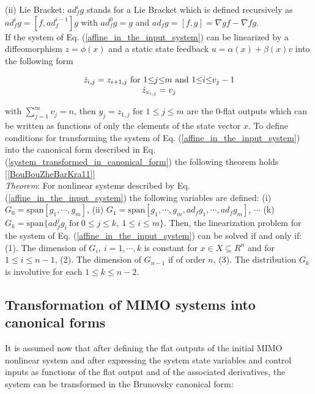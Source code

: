 \documentclass[journal]{IEEEtran}
\begin{document}
\noindent (ii) Lie Bracket: ${ad_f^i}g$ stands for a Lie Bracket which is defined recursively as ${ad_f^i}g=[f,{ad_f^{i-1}}]g$ with ${ad_f^0}g=g$ and ${ad_f}g=[f,g]={{\nabla}g}f-{{\nabla}f}g$.  \\

\noindent If the system of Eq. (\ref{affine_in_the_input_system}) can be linearized by a diffeomorphism $z=\phi(x)$ and a static state feedback $u=\alpha(x)+\beta(x)v$ into the following form

\begin{equation} \label{system_transformed_in_canonical_form}
\begin{tabular}{c}
$\dot{z}_{i,j}=z_{i+1,j} \ \text{for} \ 1{\leq}j{\leq}m \ \text{and} \ 1{\leq}i{\leq}v_j-1$ \\
$\dot{z}_{v_{i,j}}={v_j}$
\end{tabular}
\end{equation}

\noindent with ${\sum_{j=1}^m}{v_j}=n$, then $y_j=z_{1,j}$ for $1{\leq}j{\leq}m$ are the 0-flat outputs which can be written as functions of only the elements of the state vector $x$. To define conditions for transforming the system of Eq. (\ref{affine_in_the_input_system}) into the canonical form described in Eq. (\ref{system_transformed_in_canonical_form}) the following theorem holds [\ref{BouBouZheBarKra11}] \\

\noindent \textit{Theorem}: For nonlinear systems described by Eq. (\ref{affine_in_the_input_system}) the following variables are defined: (i) $G_0=\text{span}[g_1,\cdots,g_m]$, (ii) $G_1=\text{span}[g_1,\cdots,g_m,ad_f{g_1},\cdots,ad_f{g_m}]$, $\cdots$
(k) $G_k=\text{span}\{{ad_f^j}{g_i} \ \text{for} \ 0{\leq}j{\leq}k, \ 1{\leq}i{\leq}m \}$.
Then, the linearization problem for the system of Eq. (\ref{affine_in_the_input_system})
can be solved if and only if: (1). The dimension of $G_i, \ i=1,\cdots,k$ is constant for $x{\in}X{\subseteq}R^n$ and for $1{\leq}i{\leq}n-1$, (2). The dimension of $G_{n-1}$ if of order $n$, (3). The distribution $G_k$ is involutive for each $1{\leq}k{\leq}{n-2}$.

\subsection{Transformation of MIMO systems into canonical forms} \label{subsection 3.4: transformation into the Brunovksy form}

\noindent It is assumed now that after defining the flat outputs of the initial MIMO nonlinear system and after expressing the system state variables and control inputs as functions of the flat output and of the associated derivatives, the system can be transformed in the Brunovsky canonical form:
\end{document}
